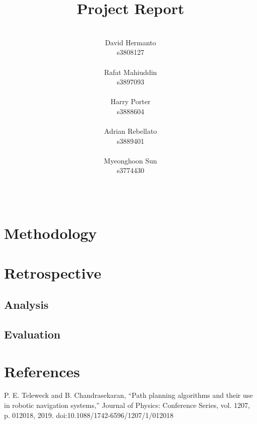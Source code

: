 \documentclass[a4paper]{article}
\title{\huge\textbf{Project Report}}
\author{
    \\
    \intersemibold
    David Hermanto\\
    \small s3808127\\
    \\
    \intersemibold
    Rafat Mahiuddin\\
    \small s3897093\\
    \\
    \intersemibold
    Harry Porter\\
    \small s3888604\\
    \\
    \intersemibold
    Adrian Rebellato\\
    \small s3889401\\
    \\
    \intersemibold
    Myeonghoon Sun\\
    \small s3774430\\
    \\\\
}
\date{}
\begin{document}
\maketitle
\thispagestyle{empty}
\clearpage
{}

\section{Methodology}
\clearpage

\section{Retrospective}
\clearpage

\subsection{Analysis}
\clearpage

\subsection{Evaluation}
\clearpage

\section*{References}

\begin{enumerate}[leftmargin=*,label={\texttt{[\arabic*]}},noitemsep]
    \item P. E. Teleweck and B. Chandrasekaran, “Path planning algorithms and their use in robotic navigation systems,” Journal of Physics: Conference Series, vol. 1207, p. 012018, 2019. doi:10.1088/1742-6596/1207/1/012018
\end{enumerate}
\end{document}
